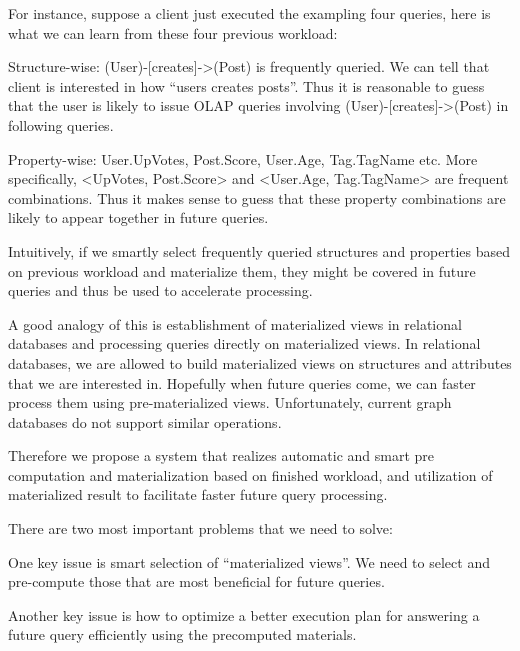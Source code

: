 For instance, suppose a client just executed the exampling four queries, here is what we can learn from these four previous workload:

Structure-wise: (User)-[creates]->(Post) is frequently queried. We can tell that client is interested in how “users creates posts”. Thus it is reasonable to guess that the user is likely to issue OLAP queries involving (User)-[creates]->(Post) in following queries.
 
Property-wise: User.UpVotes, Post.Score, User.Age, Tag.TagName etc. More specifically, <UpVotes, Post.Score> and <User.Age, Tag.TagName> are frequent combinations. Thus it makes sense to guess that these property combinations are likely to appear together in future queries.
 
Intuitively, if we smartly select frequently queried structures and properties based on previous workload and materialize them, they might be covered in future queries and thus be used to accelerate processing. 
 
A good analogy of this is establishment of materialized views in relational databases and processing queries directly on materialized views. In relational databases, we are allowed to build materialized views on structures and attributes that we are interested in. Hopefully when future queries come, we can faster process them using pre-materialized views. Unfortunately, current graph databases do not support similar operations. 
 
Therefore we propose a system that realizes automatic and smart pre computation and materialization based on finished workload, and utilization of materialized result to facilitate faster future query processing. 
 
There are two most important problems that we need to solve: 
 
One key issue is smart selection of “materialized views”. We need to select and pre-compute those that are most beneficial for future queries. 
 
Another key issue is how to optimize a better execution plan for answering a future query efficiently using the precomputed materials.
